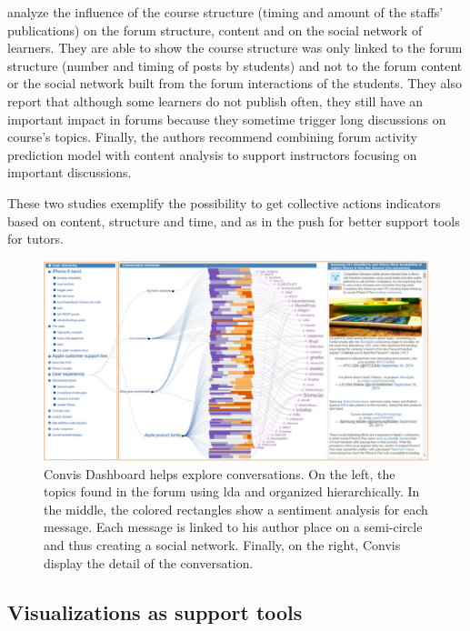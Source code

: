 \documentclass[a4paper,twoside]{article}
\begin{document}
\cite{Boroujeni2017} analyze the influence of the course structure (timing and amount of the staffs' publications) on the forum structure, content and on the social network of learners.  They are able to show the course structure was only linked to the forum structure (number and timing of posts by students) and not to the forum content or the social network built from the forum interactions of the students.  They also report that although some learners do not publish often, they still have an important impact in forums because they sometime trigger long discussions on course's topics.  Finally, the authors recommend combining forum activity prediction model with content analysis to support instructors focusing on important discussions.

These two studies exemplify the possibility to get collective actions indicators based on content, structure and time, and as in \citep{Ezen2015} the push for better support tools for tutors.

\begin{figure}[t]
  \includegraphics[width=.5\textwidth]{images/convis.png}
  \small{
    \caption{\label{fig:convis}
      Convis Dashboard \citep{Hoque2016} helps explore conversations.  On the left, the topics found in the forum using \gls{lda} and organized hierarchically.  In the middle, the colored rectangles show a sentiment analysis for each message. Each message is linked to his author place on a semi-circle and thus creating a social network. Finally, on the right, Convis display the detail of the conversation.    }}
\end{figure}

\subsection{Visualizations as support tools}
\end{document}
